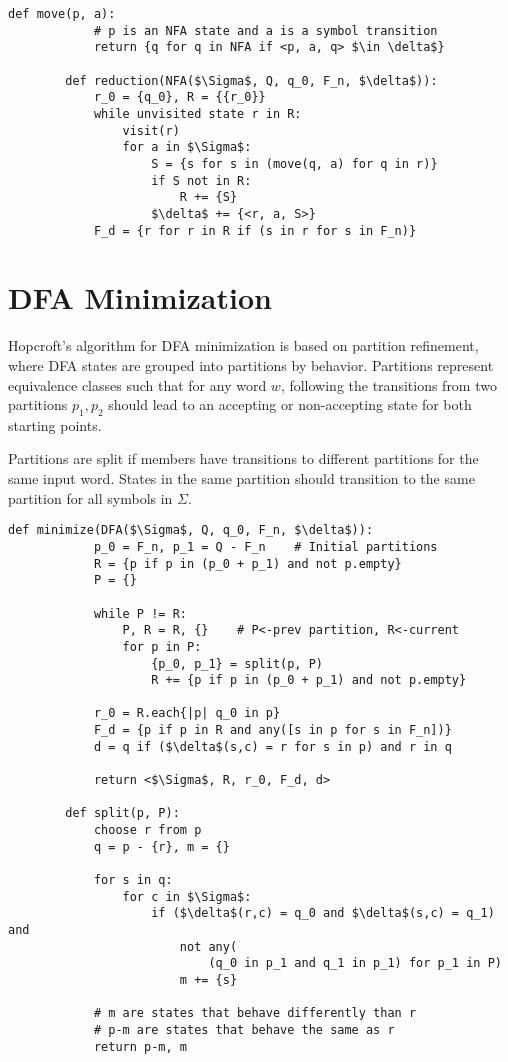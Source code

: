 \documentclass[11pt]{article}
\begin{document}
	\begin{lstlisting}[autogobble=true,mathescape]
		def move(p, a):
			# p is an NFA state and a is a symbol transition
			return {q for q in NFA if <p, a, q> $\in \delta$}
			
		def reduction(NFA($\Sigma$, Q, q_0, F_n, $\delta$)):
			r_0 = {q_0}, R = {{r_0}}
			while unvisited state r in R:
				visit(r)
				for a in $\Sigma$:
					S = {s for s in (move(q, a) for q in r)}
					if S not in R:
						R += {S}
					$\delta$ += {<r, a, S>}
			F_d = {r for r in R if (s in r for s in F_n)}
	\end{lstlisting}
	
\section{DFA Minimization}
	Hopcroft's algorithm for DFA minimization is based on partition refinement, where DFA states are grouped into partitions by behavior. Partitions represent equivalence classes such that for any word $w$, following the transitions from two partitions $p_1, p_2$ should lead to an accepting or non-accepting state for both starting points.
	
	Partitions are split if members have transitions to different partitions for the same input word. States in the same partition should transition to the same partition for all symbols in $\Sigma$.
	
	\begin{lstlisting}[autogobble=true,mathescape]
		def minimize(DFA($\Sigma$, Q, q_0, F_n, $\delta$)):
			p_0 = F_n, p_1 = Q - F_n	# Initial partitions
			R = {p if p in (p_0 + p_1) and not p.empty}
			P = {}
			
			while P != R:
				P, R = R, {}	# P<-prev partition, R<-current
				for p in P:
					{p_0, p_1} = split(p, P)
					R += {p if p in (p_0 + p_1) and not p.empty}
					
			r_0 = R.each{|p| q_0 in p}
			F_d = {p if p in R and any([s in p for s in F_n])}
			d = q if ($\delta$(s,c) = r for s in p) and r in q
			
			return <$\Sigma$, R, r_0, F_d, d>
			
		def split(p, P):
			choose r from p
			q = p - {r}, m = {}
			
			for s in q:
				for c in $\Sigma$:
					if ($\delta$(r,c) = q_0 and $\delta$(s,c) = q_1) and 
						not any(
							(q_0 in p_1 and q_1 in p_1) for p_1 in P)
						m += {s}
			
			# m are states that behave differently than r
			# p-m are states that behave the same as r
			return p-m, m 
	\end{lstlisting}
	
\end{document}
